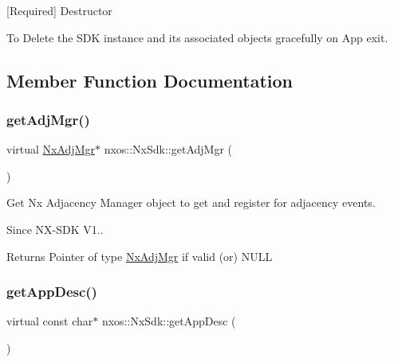 \mbox{[}Required\mbox{]} Destructor

To Delete the S\+DK instance and its associated objects gracefully on App exit. 

\subsection{Member Function Documentation}
\mbox{\label{classnxos_1_1_nx_sdk_af6e3db3e34b003693d765835ea0dbb49}} 
\subsubsection{\texorpdfstring{get\+Adj\+Mgr()}{getAdjMgr()}}
{\footnotesize\ttfamily virtual \mbox{\hyperlink{classnxos_1_1_nx_adj_mgr}{Nx\+Adj\+Mgr}}$\ast$ nxos\+::\+Nx\+Sdk\+::get\+Adj\+Mgr (\begin{DoxyParamCaption}{ }\end{DoxyParamCaption})\hspace{0.3cm}{\ttfamily [pure virtual]}}

Get Nx Adjacency Manager object to get and register for adjacency events.

\begin{DoxySince}{Since}
N\+X-\/\+S\+DK V1..
\end{DoxySince}
\begin{DoxyReturn}{Returns}
Pointer of type \mbox{\hyperlink{classnxos_1_1_nx_adj_mgr}{Nx\+Adj\+Mgr}} if valid (or) N\+U\+LL 
\end{DoxyReturn}
\mbox{\label{classnxos_1_1_nx_sdk_ad6964fa8ee52a8b0a22c27abdcf871e3}} 
\subsubsection{\texorpdfstring{get\+App\+Desc()}{getAppDesc()}}
{\footnotesize\ttfamily virtual const char$\ast$ nxos\+::\+Nx\+Sdk\+::get\+App\+Desc (\begin{DoxyParamCaption}{ }\end{DoxyParamCaption})\hspace{0.3cm}{\ttfamily [pure virtual]}}

